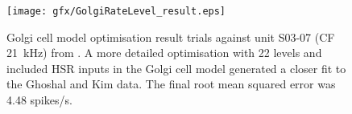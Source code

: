 \begin{figure}[htb]
  \centering
\texttt{[image: gfx/GolgiRateLevel\_result.eps]}\\
  \caption[Golgi cell model optimisation results]{Golgi cell model optimisation result trials against unit S03-07 (CF 21~kHz) from \citet{GhoshalKim:1996}.
A more detailed optimisation with 22 levels and included HSR inputs in the Golgi cell model generated a closer fit to the Ghoshal and Kim data.
The final root mean squared error was 4.48 spikes/s.
 \label{fig:GolgiResult}}
\end{figure}




